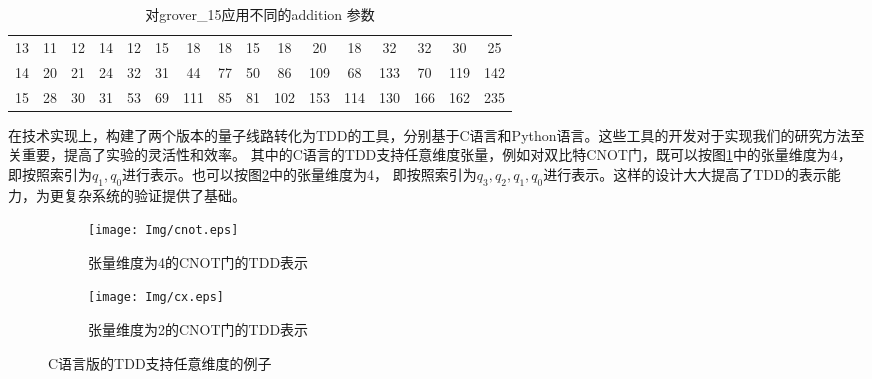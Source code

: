 \begin{table}[!htbp]
\begin{tabular}{c|ccccccccccccccc}
    \rowcolor[HTML]{8DB4E2} 
    \cellcolor[HTML]{FFFFFF}13 & 11                                               & 12                          & 14                          & 12                          & 15                          & 18                                               & 18                         & 15                          & 18                          & 20                          & 18                          & 32                          & 32                          & 30                          & 25                          \\
    \rowcolor[HTML]{8DB4E2} 
    \cellcolor[HTML]{FFFFFF}14 & 20                                               & 21                          & 24                          & 32                          & 31                          & 44                                               & 77                         & 50                          & 86                          & \cellcolor[HTML]{538DD5}109 & 68                          & \cellcolor[HTML]{538DD5}133 & 70                          & \cellcolor[HTML]{538DD5}119 & \cellcolor[HTML]{538DD5}142 \\
    \rowcolor[HTML]{538DD5} 
    \cellcolor[HTML]{FFFFFF}15 & \cellcolor[HTML]{8DB4E2}28                       & \cellcolor[HTML]{8DB4E2}30  & \cellcolor[HTML]{8DB4E2}31  & \cellcolor[HTML]{8DB4E2}53  & \cellcolor[HTML]{8DB4E2}69  & 111                                              & \cellcolor[HTML]{8DB4E2}85 & \cellcolor[HTML]{8DB4E2}81  & 102                         & 153                         & 114                         & 130                         & 166                         & 162                         & 235                        
                     
    \end{tabular}
    \caption{对grover\_15应用不同的addition 参数}%
    \label{table:addition}
\end{table}
  
在技术实现上，构建了两个版本的量子线路转化为TDD的工具，分别基于C语言和Python语言。这些工具的开发对于实现我们的研究方法至关重要，提高了实验的灵活性和效率。
其中的C语言的TDD支持任意维度张量，例如对双比特CNOT门，既可以按图\ref{fig:cnot-4}中的张量维度为4，
即按照索引为$q_1,q_0$进行表示。也可以按图\ref{fig:cnot-2}中的张量维度为4，
即按照索引为$q_3,q_2,q_1,q_0$进行表示。这样的设计大大提高了TDD的表示能力，为更复杂系统的验证提供了基础。
\begin{figure}[!htbp]
    \centering
    \begin{subfigure}[b]{.4\textwidth}
        \centering
        \texttt{[image: Img/cnot.eps]}
        \caption{张量维度为4的CNOT门的TDD表示}
        \label{fig:cnot-4}
    \end{subfigure}
    \begin{subfigure}[b]{.4\textwidth}
        \centering
        \texttt{[image: Img/cx.eps]}
        \caption{张量维度为2的CNOT门的TDD表示}
        \label{fig:cnot-2}
    \end{subfigure}
    \caption{C语言版的TDD支持任意维度的例子}
    \label{fig-cnot}
\end{figure}

